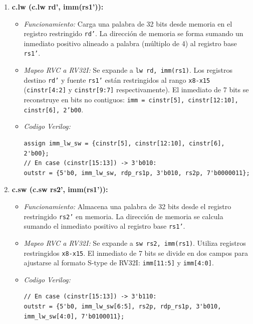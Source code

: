 \documentclass[12pt, a4paper]{article}
\begin{document}
\begin{enumerate}
    \item \textbf{c.lw (c.lw rd', imm(rs1')):}
    \begin{itemize}
        \item \textit{Funcionamiento:} Carga una palabra de 32 bits desde memoria en el registro restringido \texttt{rd'}. La dirección de memoria se forma sumando un inmediato positivo alineado a palabra (múltiplo de 4) al registro base \texttt{rs1'}.
        \item \textit{Mapeo RVC a RV32I:} Se expande a \texttt{lw rd, imm(rs1)}. Los registros destino \texttt{rd'} y fuente \texttt{rs1'} están restringidos al rango \texttt{x8-x15} (\texttt{cinstr[4:2]} y \texttt{cinstr[9:7]} respectivamente). El inmediato de 7 bits se reconstruye en bits no contiguos: \texttt{imm = {cinstr[5], cinstr[12:10], cinstr[6], 2'b00}}.
        \item \textit{Codigo Verilog:}
        \begin{lstlisting}[style=verilogstyle]
assign imm_lw_sw = {cinstr[5], cinstr[12:10], cinstr[6], 2'b00};
// En case (cinstr[15:13]) -> 3'b010:
outstr = {5'b0, imm_lw_sw, rdp_rs1p, 3'b010, rs2p, 7'b0000011};
        \end{lstlisting}
    \end{itemize}

    \item \textbf{c.sw (c.sw rs2', imm(rs1')):}
    \begin{itemize}
        \item \textit{Funcionamiento:} Almacena una palabra de 32 bits desde el registro restringido \texttt{rs2'} en memoria. La dirección de memoria se calcula sumando el inmediato positivo al registro base \texttt{rs1'}.
        \item \textit{Mapeo RVC a RV32I:} Se expande a \texttt{sw rs2, imm(rs1)}. Utiliza registros restringidos \texttt{x8-x15}. El inmediato de 7 bits se divide en dos campos para ajustarse al formato S-type de RV32I: \texttt{imm[11:5]} y \texttt{imm[4:0]}.
        \item \textit{Codigo Verilog:}
        \begin{lstlisting}[style=verilogstyle]
// En case (cinstr[15:13]) -> 3'b110:
outstr = {5'b0, imm_lw_sw[6:5], rs2p, rdp_rs1p, 3'b010, imm_lw_sw[4:0], 7'b0100011};
        \end{lstlisting}
    \end{itemize}


\end{enumerate}
\end{document}
